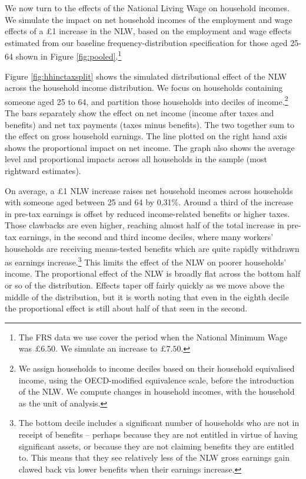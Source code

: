 We now turn to the effects of the National Living Wage on household incomes. We simulate the impact on net household incomes of the employment and wage effects of a \pounds 1 increase in the NLW, based on the employment and wage effects estimated from our baseline frequency-distribution specification for those aged 25-64 shown in Figure \ref{fig:pooled}.\footnote{The FRS data we use cover the period when the National Minimum Wage was $\pounds 6.50$. We simulate an increase to $\pounds 7.50$.} \par

Figure \ref{fig:hhinctaxsplit} shows the simulated distributional effect of the NLW across the household income distribution. We focus on households containing someone aged 25 to 64, and partition those households into deciles of income.\footnote{We assign households to income deciles based on their household equivalised income, using the OECD-modified equivalence scale, before the introduction of the NLW. We compute changes in household incomes, with the household as the unit of analysis.} The bars separately show the effect on net income (income after taxes and benefits) and net tax payments (taxes minus benefits). The two together sum to the effect on gross household earnings. The line plotted on the right hand axis shows the proportional impact on net income. The graph also shows the average level and proportional impacts across all households in the sample (most rightward estimates). \par

On average, a \pounds 1 NLW increase raises net household incomes across households with someone aged between 25 and 64 by 0.31\%. Around a third of the increase in pre-tax earnings is offset by reduced income-related benefits or higher taxes. Those clawbacks are even higher, reaching almost half of the total increase in pre-tax earnings, in the second and third income deciles, where many workers' households are receiving means-tested benefits which are quite rapidly withdrawn as earnings increase.\footnote{The bottom decile includes a significant number of households who are not in receipt of benefits -- perhaps because they are not entitled in virtue of having significant assets, or because they are not claiming benefits they are entitled to. This means that they see relatively less of the NLW gross earnings gain clawed back via lower benefits when their earnings increase.} This limits the effect of the NLW on poorer households' income. The proportional effect of the NLW is broadly flat across the bottom half or so of the distribution. Effects taper off fairly quickly as we move above the middle of the distribution, but it is worth noting that even in the eighth decile the proportional effect is still about half of that seen in the second.

